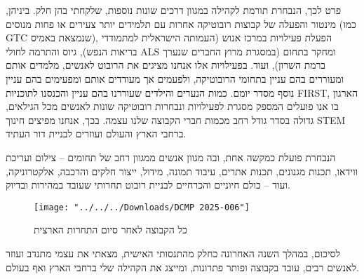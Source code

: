 \documentclass[]{article}
\begin{document}
    
    פרט לכך, הנבחרת תורמת לקהילה במגוון דרכים שונות נוספות, שלקחתי בהן חלק. ביניהן, מינטור והפעלה של קבוצות רובוטיקה אחרות עם תלמידים יותר צעירים או פחות מנוסים (כמו GTC שנמצאת באמיס), הפעלת פעילויות במרכז אנוש (העמותה הישראלית למתמודדי בריאות הנפש), גיוס והתרמה לחולי ALS ומחקר בתחום (במסגרת מרוץ החברים שנערך ברמת השרון), ועוד. בפעילויות אלו אנחנו מציגים את הרובוט לאנשים, מלמדים אותם ומעוררים בהם עניין בתחומי הרובוטיקה, ולפעמים אך מעודדים אותם ומפעימים בהם עניין נוסף מסדר יומם. כמות הנערים והילדים שעוררנו בהם עניין והכנסנו לתוכניות FIRST, הארגון בו אנו פועלים המספק מסגרת לפעילויות ונבחרות רובוטיקה שונות לאנשים מכל הגילאים, גדולה בסדר גודל רחב מכמות חברי הקבוצה שלנו עצמה. בכך, אנחנו מפיצים חינוך STEM ברחבי הארץ והעולם ועוזרים לבניית דור העתיד. 
    
    הנבחרת פועלת כמקשה אחת, ובה מגוון אנשים ממגוון רחב של תחומים – צילום ועריכת ווידאו, תכנות מגנונים, תכנות אתרים, עיבוד תמונה, מידול, ייצור חלקים והרכבה, אלקטרוניקה, ועוד – כולם חיוניים והכרחיים לבניית רובוט תחרותי שעובד במהירות ובדיוק. 
    \begin{figure}[h]
        \centering
        \texttt{[image: "../../../Downloads/DCMP 2025-006"]}
        \caption{כל הקבוצה לאחר סיום התחרות הארצית}
        \label{fig:dcmp-2025-006}
    \end{figure}
    
    לסיכום, במהלך השנה האחרונה כחלק מהתנסותי האישית, מצאתי את עצמי מתנדב ועוזר לאנשים רבים, עובד בקבוצה ופותר פתרונות, ומייצג את הקהילה שלי ברחבי הארץ ואף בעולם. 
    
    
    
    
\end{document}
